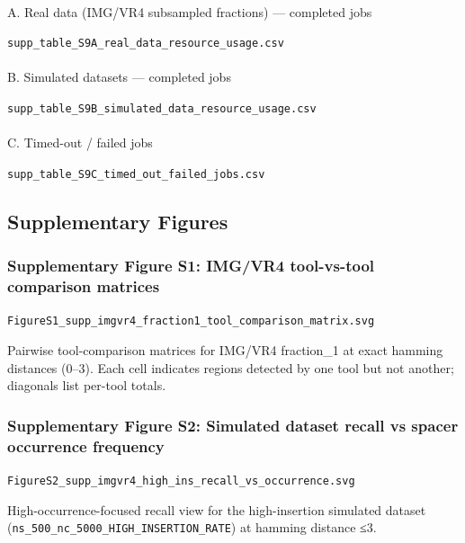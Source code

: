 \documentclass[
]{article}
\makeatletter
\let\oldparagraph\paragraph
\renewcommand{\paragraph}{
    \@ifstar
      \xxxParagraphStar
      \xxxParagraphNoStar
  }
\newcommand{\xxxParagraphStar}[1]{\oldparagraph*{#1}\mbox{}}
\newcommand{\xxxParagraphNoStar}[1]{\oldparagraph{#1}\mbox{}}
\makeatother
\begin{document}
\paragraph{A. Real data (IMG/VR4 subsampled fractions) --- completed
jobs}\label{a.-real-data-imgvr4-subsampled-fractions-completed-jobs}

\texttt{supp\_table\_S9A\_real\_data\_resource\_usage.csv}

\paragraph{B. Simulated datasets --- completed
jobs}\label{b.-simulated-datasets-completed-jobs}

\texttt{supp\_table\_S9B\_simulated\_data\_resource\_usage.csv}

\paragraph{C. Timed-out / failed jobs}\label{c.-timed-out-failed-jobs}

\texttt{supp\_table\_S9C\_timed\_out\_failed\_jobs.csv}

\subsection{Supplementary Figures}\label{supplementary-figures}

\subsubsection{Supplementary Figure S1: IMG/VR4 tool-vs-tool comparison
matrices}\label{fig-supp-real-matrix}

\texttt{FigureS1\_supp\_imgvr4\_fraction1\_tool\_comparison\_matrix.svg}

Pairwise tool-comparison matrices for IMG/VR4 fraction\_1 at exact
hamming distances (0--3). Each cell indicates regions detected by one
tool but not another; diagonals list per-tool totals.

\subsubsection{Supplementary Figure S2: Simulated dataset recall vs
spacer occurrence frequency}\label{fig-supp-sim-recall}

\texttt{FigureS2\_supp\_imgvr4\_high\_ins\_recall\_vs\_occurrence.svg}

High-occurrence-focused recall view for the high-insertion simulated
dataset (\texttt{ns\_500\_nc\_5000\_HIGH\_INSERTION\_RATE}) at hamming
distance ≤3.
\end{document}
